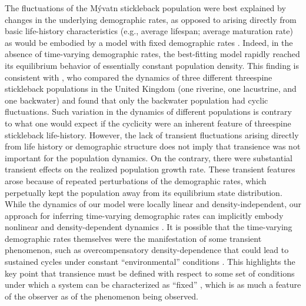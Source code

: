 \documentclass[11pt]{article}
\begin{document}
The fluctuations of the M\'{y}vatn stickleback population
were best explained by changes in the underlying demographic rates, 
as opposed to arising directly from basic life-history characteristics 
(e.g., average lifespan; average maturation rate) 
as would be embodied by a model with fixed demographic rates \citep{caswell2001matrix}.
Indeed, in the absence of time-varying demographic rates,
the best-fitting model rapidly reached its equilibrium behavior 
of essentially constant population density.
This finding is consistent with \cite{wootton2005},
who compared the dynamics of three different threespine stickleback populations 
in the United Kingdom (one riverine, one lacustrine, and one backwater)
and found that only the backwater population had cyclic fluctuations.
Such variation in the dynamics of different populations 
is contrary to what one would expect if the cyclicity were 
an inherent feature of threespine stickleback life-history.
However, the lack of transient fluctuations arising directly 
from life history or demographic structure
does not imply that transience was not important for the population dynamics.
On the contrary, 
there were substantial transient effects on the realized population growth rate.
These transient features arose because of repeated perturbations
of the demographic rates, which perpetually kept the population
away from its equilibrium state distribution.
While the dynamics of our model were locally linear and density-independent,
our approach for inferring time-varying demographic rates can implicitly embody
nonlinear and density-dependent dynamics \citep{ives2012}.
It is possible that the time-varying demographic rates themselves were the manifestation
of some transient phenomenon, 
such as overcompensatory density-dependence that could lead to sustained cycles under
constant ``environmental'' conditions
\citep[e.g.,][]{may1974}.
This highlights the key point that transience must be defined with respect to some 
set of conditions under which a system can be characterized as ``fixed''
\citep{hastings2010},
which is as much a feature of the observer as of the phenomenon being observed.
\end{document}
